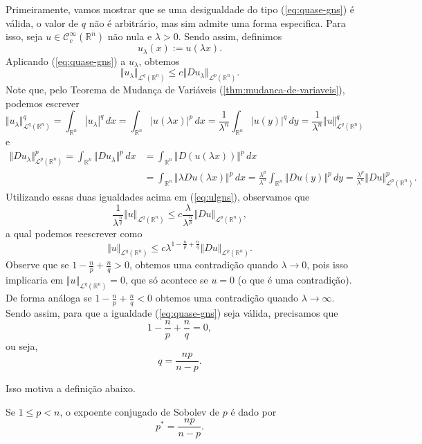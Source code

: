 \documentclass[a4paper, 11pt]{book}
\theoremstyle{definition}
\newcommand{\bR}{\mathbb{R}}
\newcommand{\cC}{\mathcal{C}}
\newcommand{\cL}{\mathcal{L}}
\begin{document}
Primeiramente, vamos mostrar que se uma desigualdade do tipo (\ref{eq:quase-gns}) é válida, o valor de $q$ não é arbitrário, mas sim admite uma forma especifica.
Para isso, seja $u \in \cC^\infty_c(\bR^n)$ não nula e $\lambda > 0$.
Sendo assim, definimos
\[
    u_\lambda(x) := u(\lambda x).
\]
Aplicando (\ref{eq:quase-gns}) a $u_\lambda$, obtemos
\begin{equation} \label{eq:ulgns}
    \Vert u_\lambda \Vert_{\cL^q(\bR^n)} \leqslant c \Vert Du_\lambda \Vert_{\cL^p(\bR^n)}.
\end{equation}
Note que, pelo Teorema de Mudança de Variáveis (\ref{thm:mudanca-de-variaveis}), podemos escrever
\[
    \Vert u_\lambda \Vert_{\cL^q(\bR^n)}^q = \int_{\bR^n} |u_\lambda|^q \,dx = \int_{\bR^n} |u(\lambda x)|^p \,dx = \frac{1}{\lambda^n} \int_{\bR^n} |u(y)|^q \,dy = \frac{1}{\lambda^n}\Vert u \Vert_{\cL^q(\bR^n)}^q
\]
e
\[
    \begin{aligned}
        \Vert Du_\lambda \Vert_{\cL^p(\bR^n)}^p = \int_{\bR^n} \Vert Du_\lambda \Vert^p \,dx &= \int_{\bR^n} \Vert D(u(\lambda x)) \Vert^p \,dx \\
        &= \int_{\bR^n} \Vert \lambda Du(\lambda x) \Vert^p \,dx = \frac{\lambda^p}{\lambda^n} \int_{\bR^n} \Vert Du(y) \Vert^p \,dy = \frac{\lambda^p}{\lambda^n}\Vert Du \Vert_{\cL^p(\bR^n)}^p.
    \end{aligned}
\]
Utilizando essas duas igualdades acima em (\ref{eq:ulgns}), observamos que
\[
    \frac{1}{\lambda^{\frac{n}{q}}} \Vert u \Vert_{\cL^q(\bR^n)} \leqslant c \frac{\lambda}{\lambda^{\frac{n}{p}}}\Vert Du \Vert_{\cL^p(\bR^n)},
\]
a qual podemos reescrever como
\begin{equation}
    \Vert u \Vert_{\cL^q(\bR^n)} \leqslant c\lambda^{1 - \frac{n}{p}  + \frac{n}{q}}\Vert Du \Vert_{\cL^p(\bR^n)}.
\end{equation}
Observe que se $1 - \frac{n}{p} + \frac{n}{q} > 0$, obtemos uma contradição quando $\lambda \to 0$, pois isso implicaria em $\Vert u \Vert_{\cL^q(\bR^n)} = 0$,
que só acontece se $u = 0$ (o que é uma contradição).
De forma análoga se $1 - \frac{n}{p} + \frac{n}{q} < 0$ obtemos uma contradição quando $\lambda \to \infty$.
Sendo assim, para que a igualdade (\ref{eq:quase-gns}) seja válida, precisamos que
\[
    1 - \frac{n}{p} + \frac{n}{q} = 0,
\]
ou seja,
\[
    q = \frac{np}{n - p}.
\]

Isso motiva a definição abaixo.
\begin{dbox}
    Se $1 \leqslant p < n$, o expoente conjugado de Sobolev de $p$ é dado por
    \[
        p^* = \frac{np}{n - p}.
    \]
\end{dbox}
\end{document}
